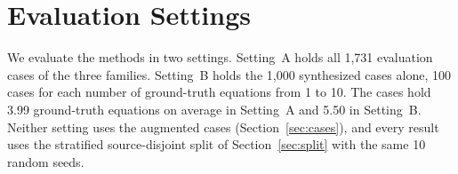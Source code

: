 \section{Evaluation Settings}
\label{sec:settings}

We evaluate the methods in two settings. Setting~A holds all 1,731 evaluation cases of the three
families. Setting~B holds the 1,000 synthesized cases alone, 100 cases for each number of
ground-truth equations from 1 to 10. The cases hold 3.99 ground-truth equations on average in
Setting~A and 5.50 in Setting~B. Neither setting uses the augmented cases
(Section~\ref{sec:cases}), and every result uses the stratified source-disjoint split of
Section~\ref{sec:split} with the same 10 random seeds.

